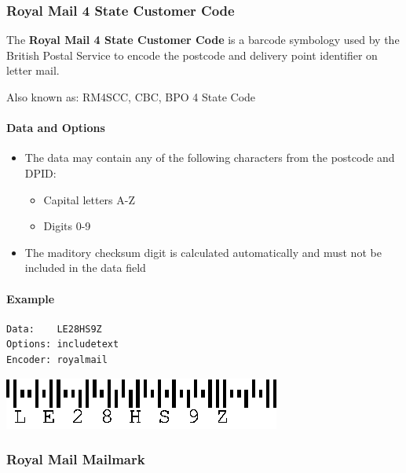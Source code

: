 \hypertarget{royal-mail-4-state-customer-code}{%
\subsubsection{Royal Mail 4 State Customer
Code}\label{royal-mail-4-state-customer-code}}

The \textbf{Royal Mail 4 State Customer Code} is a barcode symbology
used by the British Postal Service to encode the postcode and delivery
point identifier on letter mail.

Also known as: RM4SCC, CBC, BPO 4 State Code

\hypertarget{data-and-options-47}{%
\paragraph{Data and Options}\label{data-and-options-47}}

\begin{itemize}
\tightlist
\item
  The data may contain any of the following characters from the postcode
  and DPID:

  \begin{itemize}
  \tightlist
  \item
    Capital letters A-Z
  \item
    Digits 0-9
  \end{itemize}
\item
  The maditory checksum digit is calculated automatically and must not
  be included in the data field
\end{itemize}

\hypertarget{example-10}{%
\paragraph{Example}\label{example-10}}

\begin{verbatim}
Data:    LE28HS9Z
Options: includetext
Encoder: royalmail
\end{verbatim}

\includegraphics{images/rm4scc-1.eps}

\hypertarget{royal-mail-mailmark}{%
\subsubsection{Royal Mail Mailmark}\label{royal-mail-mailmark}}

